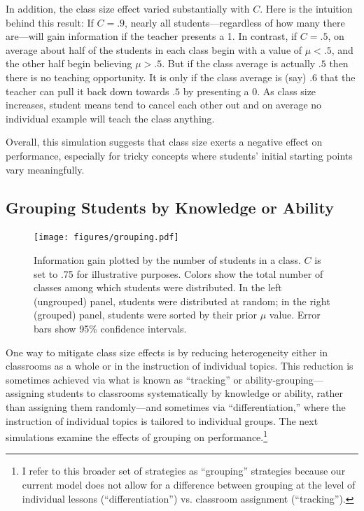 \documentclass[10pt,letterpaper]{article}
\begin{document}
In addition, the class size effect varied substantially with $C$. Here is the intuition behind this result: If $C=.9$, nearly all students---regardless of how many there are---will gain information if the teacher presents a 1. In contrast, if $C=.5$, on average about half of the students in each class begin with a value of $\mu < .5$, and the other half begin believing $\mu > .5$. But if the class average is actually $.5$ then there is no teaching opportunity. It is only if the class average is (say) $.6$ that the teacher can pull it back down towards $.5$ by presenting a 0. As class size increases, student means tend to cancel each other out and  on average no individual example will teach the class anything. 

Overall, this simulation suggests that class size exerts a negative effect on performance, especially for tricky concepts where students' initial starting points vary meaningfully. 

\subsection{Grouping Students by Knowledge or Ability}

\begin{figure}
\begin{center}
\texttt{[image: figures/grouping.pdf]}
\end{center}
\caption{\label{fig:grouping} Information gain plotted by the number of students in a class. $C$ is set to .75 for illustrative purposes. Colors show the total number of classes among which students were distributed. In the left (ungrouped) panel, students were distributed at random; in the right (grouped) panel, students were sorted by their prior $\mu$ value. Error bars show 95\% confidence intervals.}
\end{figure}


One way to mitigate class size effects is by reducing heterogeneity either in classrooms as a whole or in the instruction of individual topics. This reduction is sometimes achieved via what is known as ``tracking'' or ability-grouping---assigning students to classrooms systematically by knowledge or ability, rather than assigning them randomly---and sometimes via ``differentiation,'' where the instruction of individual topics is tailored to individual groups. The next simulations examine the effects of grouping on performance.\footnote{I refer to this broader set of strategies as ``grouping'' strategies because our current model does not allow for a difference between grouping at the level of individual lessons (``differentiation'') vs. classroom assignment (``tracking'').} 
\end{document}
